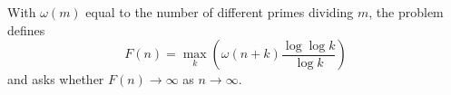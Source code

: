 With $\omega(m)$ equal to the number of different primes dividing $m$, the problem defines
\[F(n)=\max_k\left(\omega(n+k)\frac{\log\log k}{\log k}\right)\]
and asks whether $F(n)\to\infty$ as $n\to\infty$.
